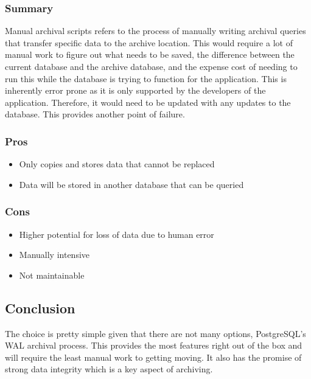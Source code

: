 \documentclass[draftclsnofoot,onecolumn,journal,letterpaper,compsoc,10pt]{IEEEtran}
\begin{document}
        \subsubsection{Summary}
        
        Manual archival scripts refers to the process of manually writing archival queries that transfer specific data to the archive location.  This would require a lot of manual work to figure out what needs to be saved, the difference between the current database and the archive database, and the expense cost of needing to run this while the database is trying to function for the application.  This is inherently error prone as it is only supported by the developers of the application.  Therefore, it would need to be updated with any updates to the database.  This provides another point of failure.
        
        \subsubsection{Pros}
        \begin{itemize}
            \item Only copies and stores data that cannot be replaced
            \item Data will be stored in another database that can be queried
        \end{itemize}
        
        \subsubsection{Cons}
        \begin{itemize}
            \item Higher potential for loss of data due to human error
            \item Manually intensive
            \item Not maintainable
        \end{itemize}
    
    \subsection{Conclusion}
    
    The choice is pretty simple given that there are not many options, PostgreSQL's WAL archival process.  This provides the most features right out of the box and will require the least manual work to getting moving.  It also has the promise of strong data integrity which is a key aspect of archiving.



\end{document}
